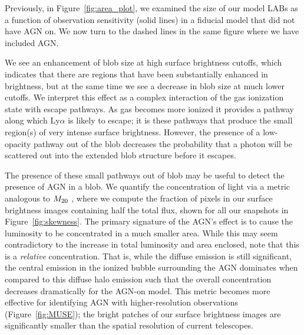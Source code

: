 Previously, in Figure~\ref{fig:area_plot}, we examined the size of our model LABs as a function of observation sensitivity (solid lines) in a fiducial model that did not have AGN on.  We now turn to the dashed lines in the same figure where we have included AGN.

We see an enhancement of blob size at high surface brightness cutoffs, which indicates that there are regions that have been substantially enhanced in brightness, but at the same time we see a decrease in blob size at much lower cutoffs. We interpret this effect as a complex interaction of the gas ionization state with escape pathways. As gas becomes more ionized it provides a pathway along which Ly$\alpha$ is likely to escape; it is these pathways that produce the small region(s) of very intense surface brightness. However, the presence of a low-opacity pathway out of the blob decreases the probability that a photon will be scattered out into the extended blob structure before it escapes.

The presence of these small pathways out of blob may be useful to detect the presence of AGN in a blob.
We quantify the concentration of light via a metric analogous to $M_{\rm 20}$ \citep{Lotz2004}, where we compute the fraction of pixels in our surface brightness images containing half the total flux, shown for all our snapshots in Figure~\ref{fig:skewness}.
The primary signature of the AGN's effect is to cause the luminosity to be concentrated in a much smaller area.
While this may seem contradictory to the increase in total luminosity and area enclosed, note that this is a {\it relative} concentration.
That is, while the diffuse emission is still significant, the central emission in the ionized bubble surrounding the AGN dominates when compared to this diffuse halo emission such that the overall concentration decreases dramatically for the AGN-on model.
This metric becomes more effective for identifying AGN with higher-resolution observations (Figure~\ref{fig:MUSE}); the bright patches of our surface brightness images are significantly smaller than the spatial resolution of current telescopes.


